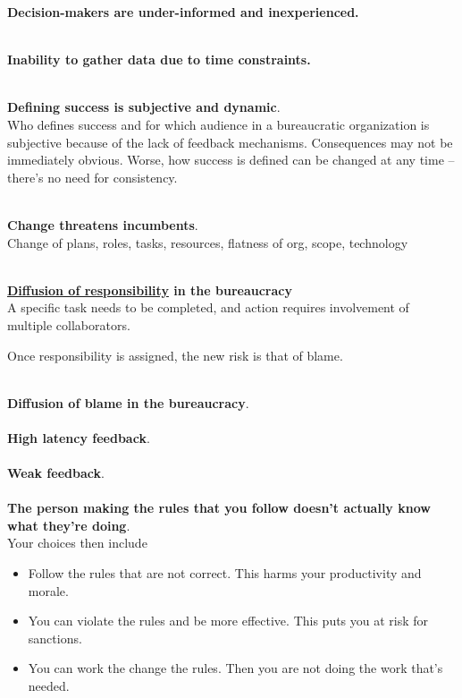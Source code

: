 \textbf{Decision-makers are under-informed and inexperienced.}

\ \\

\textbf{Inability to gather data due to time constraints.}

\ \\

\textbf{Defining success is subjective and dynamic}. \\
Who defines success and for which audience in a bureaucratic organization is subjective because of the lack of feedback mechanisms. Consequences may not be immediately obvious. Worse, how success is defined can be changed at any time -- there's no need for consistency. 

\ \\

\textbf{Change threatens incumbents}. \\
Change of plans, roles, tasks, resources, flatness of org, scope, technology 

\ \\

\textbf{\href{https://en.wikipedia.org/wiki/Diffusion_of_responsibility}{Diffusion of responsibility} in the bureaucracy} \\
A specific task needs to be completed, and action requires involvement of multiple collaborators. 

Once responsibility is assigned, the new risk is that of blame.

\ \\

\textbf{Diffusion of blame in the bureaucracy}. \\

\ \\

\textbf{High latency feedback}. \\

\ \\

\textbf{Weak feedback}. \\

\ \\

\textbf{The person making the rules that you follow doesn't actually know what they're doing}. \\
Your choices then include
\begin{itemize}
    \item Follow the rules that are not correct. This harms your productivity and morale. 
\item You can violate the rules and be more effective. This puts you at risk for sanctions. 
\item You can work the change the rules. Then you are not doing the work that's needed.
\end{itemize}


